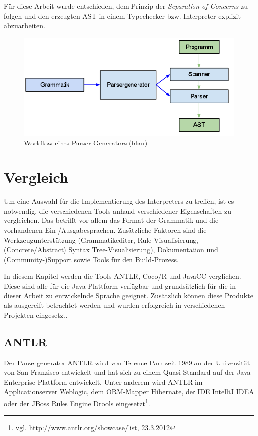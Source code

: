 Für diese Arbeit wurde entschieden, dem Prinzip der \emph{Separation of Concerns} zu folgen und den erzeugten AST in einem Typechecker bzw. Interpreter explizit abzuarbeiten.

 

\begin{figure}[h]
\includegraphics[scale=0.6]{figures/parser_generator_workflow}
\caption{Workflow eines Parser Generators (blau).}
\label{abb_parser_generator_workflow}
\end{figure}



\section{Vergleich}
\label{tools_vergleich}

Um eine Auswahl für die Implementierung des Interpreters zu treffen, ist es not\-wen\-dig, die verschiedenen Tools anhand verschiedener Eigenschaften zu vergleichen. Das betrifft vor allem das Format der Grammatik und die vorhandenen Ein-/Ausgabesprachen.
Zu\-sätz\-liche Faktoren sind die Werkzeugunterstützung (Grammatikeditor, Rule-Visualisierung, (Concrete/Abstract) Syntax Tree-Visualisierung), Dokumentation und (Community-)Support sowie Tools für den Build-Prozess.

In diesem Kapitel werden die Tools ANTLR, Coco/R und JavaCC verglichen. Diese sind alle für die Java-Plattform verfügbar und grundsätzlich für die in dieser Arbeit zu entwickelnde Sprache geeignet. Zu\-sätz\-lich können diese Produkte als ausgereift betrachtet werden und wurden erfolgreich in verschiedenen Projekten eingesetzt.


\subsection{ANTLR}

Der Parsergenerator ANTLR wird von Terence Parr seit 1989 an der Universität von San Franzisco entwickelt und hat sich zu einem Quasi-Standard auf der Java Enterprise Plattform entwickelt. Unter anderem wird ANTLR im Applicationserver Weblogic, dem ORM-Mapper Hibernate, der IDE IntelliJ IDEA oder der JBoss Rules Engine Drools eingesetzt\footnote{vgl. http://www.antlr.org/showcase/list, 23.3.2012}.

